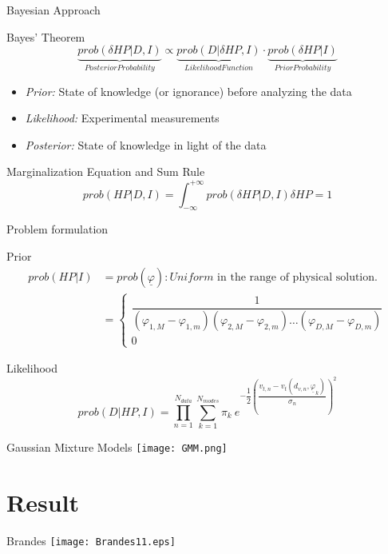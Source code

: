 \documentclass{beamer}
\begin{document}
	\begin{frame}{Bayesian Approach}
		\begin{block}{Bayes' Theorem}
			\begin{equation*}
				\underbrace{prob(\delta HP|D,I)}_{Posterior Probability} \propto
				\underbrace{prob(D|\delta HP,I)}_{Likelihood Function} \cdot \underbrace{prob(\delta HP|I)}_{Prior Probability}
			\end{equation*}
			\begin{itemize}
				\item \textit{Prior:} State of knowledge (or ignorance) before analyzing the data 
				
				\item \textit{Likelihood:} Experimental measurements
				\item \textit{Posterior:} State of knowledge in light of the data
			\end{itemize}
		\end{block}
	
	
		\begin{block}{Marginalization Equation and Sum Rule}
			\begin{equation*}
				prob(HP|D,I) = \int_{-\infty}^{+\infty} prob(\delta HP|D,I) \delta HP = 1
			\end{equation*}
		\end{block}
	\end{frame}
	
	\begin{frame}{Problem formulation}
		\begin{block}{Prior}
			\begin{equation*}
				\begin{split}			
				prob(HP|I) & = prob(\underline{\varphi}) : \textit{Uniform} \text{ in the range of physical solution.}\\
				& = \left\{ 
				\begin{array}{cc}
				\dfrac{1}{(\varphi_{1, M} - \varphi_{1, m}) (\varphi_{2, M} - \varphi_{2, m}) \dots (\varphi_{D, M} - \varphi_{D, m})} \\
				0 
				\end{array} \right.
				\end{split}
			\end{equation*}				
		\end{block}
		
		\begin{block}{Likelihood}
			\begin{equation*}
				prob(D|HP,I) = \prod_{n = 1}^{N_{data}} \sum_{k = 1}^{N_{modes}} \pi_k \ e^{-\dfrac{1}{2} \left(\dfrac{v_{t,n} - v_t(d_{v,n}, \underline{\varphi}_k)}{\sigma_n} \right)^2}
			\end{equation*}
		\end{block}	
	\end{frame}

	\begin{frame}{Gaussian Mixture Models}
		\centering
		\texttt{[image: GMM.png]}
	\end{frame}

\section{Result}
	\begin{frame}{Brandes}
		\centering
		\texttt{[image: Brandes11.eps]}
	\end{frame}
\end{document}
